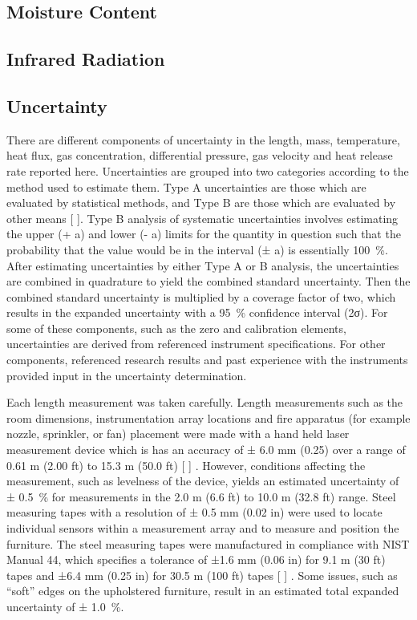 \documentclass[12pt,oneside]{book}
\begin{document}
\subsection{Moisture Content}
\label{subsec:Moisture_Content}

\subsection{Infrared Radiation}
\label{subsec:Infrared_Radiation}

\subsection{Uncertainty}
\label{subsec:Uncertainty}

There are different components of uncertainty in the length, mass, temperature, heat flux, gas concentration, differential pressure, gas velocity and heat release rate reported here. Uncertainties are grouped into two categories according to the method used to estimate them. Type A uncertainties are those which are evaluated by statistical methods, and Type B are those which are evaluated by other means  [ ]. Type B analysis of systematic uncertainties involves estimating the upper (+ a) and lower (- a) limits for the quantity in question such that the probability that the value would be in the interval (± a) is essentially 100~\%. After estimating uncertainties by either Type A or B analysis, the uncertainties are combined in quadrature to yield the combined standard uncertainty. Then the combined standard uncertainty is multiplied by a coverage factor of two, which results in the expanded uncertainty with a 95~\% confidence interval (2σ).  For some of these components, such as the zero and calibration elements, uncertainties are derived from referenced instrument specifications. For other components, referenced research results and past experience with the instruments provided input in the uncertainty determination. 

Each length measurement was taken carefully. Length measurements such as the room dimensions, instrumentation array locations and fire apparatus (for example nozzle, sprinkler, or fan) placement were made with a hand held laser measurement device which is has an accuracy of ± 6.0 mm (0.25) over a range of 0.61 m (2.00 ft) to 15.3 m (50.0 ft) [ ] .  However, conditions affecting the measurement, such as levelness of the device, yields an estimated uncertainty of ± 0.5~\% for measurements in the 2.0 m (6.6 ft) to 10.0 m (32.8 ft) range.  Steel measuring tapes with a resolution of  ± 0.5 mm (0.02 in) were used to locate individual sensors within a measurement array and to measure and position the furniture. The steel measuring tapes were manufactured in compliance with NIST Manual 44, which specifies a tolerance of ±1.6 mm (0.06 in) for 9.1 m (30 ft) tapes and ±6.4 mm (0.25 in) for 30.5 m (100 ft) tapes [ ] .  Some issues, such as “soft” edges on the upholstered furniture, result in an estimated total expanded uncertainty of  ± 1.0~\%. 
\end{document}
